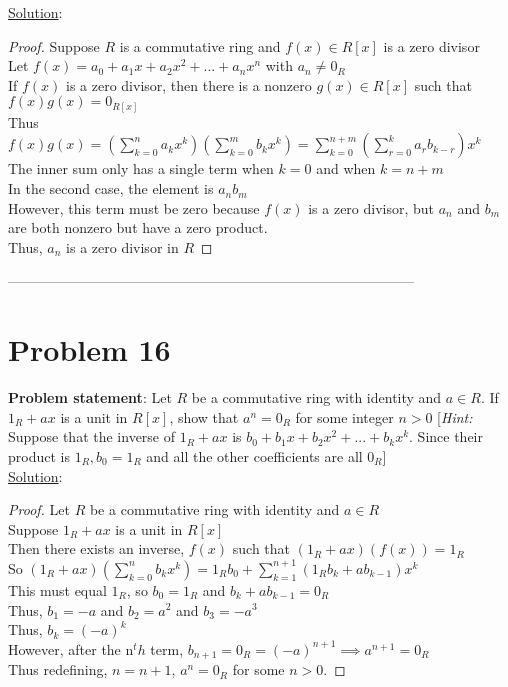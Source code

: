 \documentclass{article} %
\begin{document}
\underline{Solution}: 
\begin{addmargin}[1em]{0em}
\begin{proof}
Suppose $R$ is a commutative ring and $f(x) \in R[x]$ is a zero divisor
\\Let $f(x) = a_0 + a_1x + a_2x^2 + ... + a_nx^n$ with $a_n \neq 0_R$
\\If $f(x)$ is a zero divisor, then there is a nonzero $g(x) \in R[x]$ such that $f(x)g(x) = 0_{R[x]}$
\\Thus $f(x)g(x) = (\sum_{k=0}^{n}{a_kx^k})(\sum_{k=0}^{m}{b_kx^k}) = \sum_{k=0}^{n+m}{(\sum_{r=0}^{k}{a_rb_{k-r}})x^k}$
\\The inner sum only has a single term when $k = 0$ and when $k = n+m$
\\In the second case, the element is $a_nb_m$
\\However, this term must be zero because $f(x)$ is a zero divisor, but $a_n$ and $b_m$ are both nonzero but have a zero product.
\\Thus, $a_n$ is a zero divisor in $R$
\end{proof}
\end{addmargin}
\newpage
\----------------------------------------------------------------------------------------
\section*{Problem 16}
\textbf{Problem statement}: Let $R$ be a commutative ring with identity and $a \in R$.  If $1_R + ax$ is a unit in $R[x]$, show that $a^n = 0_R$ for some integer $n > 0$ [\textit{Hint:} Suppose that the inverse of $1_R + ax$ is $b_0 + b_1x + b_2x^2 + ... + b_kx^k$.  Since their product is $1_R, b_0 = 1_R$ and all the other coefficients are all $0_R$]
\\

\underline{Solution}: 
\begin{addmargin}[1em]{0em}
\begin{proof}
Let $R$ be a commutative ring with identity and $a \in R$
\\Suppose $1_R + ax$ is a unit in $R[x]$
\\Then there exists an inverse, $f(x)$ such that $(1_R + ax)(f(x)) = 1_{R}$
\\So $(1_R+ax)(\sum_{k=0}^{n}{b_kx^k}) =1_Rb_0 + \sum_{k=1}^{n+1}{(1_Rb_k + ab_{k-1})x^k}$
\\This must equal $1_R$, so $b_0 = 1_R$ and $b_k + ab_{k-1} = 0_R$
\\Thus, $b_1 = -a$ and $b_2 = a^2$ and $b_3 = -a^3$
\\Thus, $b_k = (-a)^k$
\\However, after the n$^th$ term, $b_{n+1} = 0_R = (-a)^{n+1} \implies a^{n+1} = 0_R$
\\Thus redefining, $n = n+1$, $a^n = 0_R$ for some $n > 0$.
\end{proof}
\end{addmargin}
\newpage
\end{document}
